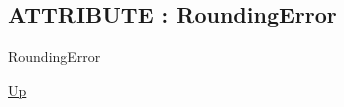 \par
\par
\subsection*{ATTRIBUTE : RoundingError}
\hypertarget{ecldoc:ml_core.config.roundingerror}{}
\begin{minipage}[t]{\textwidth}
\begin{flushleft}
 RoundingError 
\end{flushleft}
\end{minipage}
\hyperlink{ecldoc:ML_Core.Config}{Up}

\par
\par

